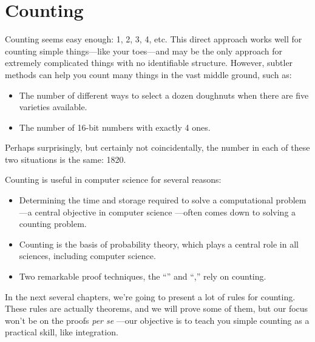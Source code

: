 \part{Counting}
\label{part:counting}

\partintro

Counting seems easy enough: 1, 2, 3, 4, etc.  This direct approach
works well for counting simple things---like your toes---and may be
the only approach for extremely complicated things with no
identifiable structure.  However, subtler methods can help you count
many things in the vast middle ground, such as:
\begin{itemize}

\item The number of different ways to select a dozen doughnuts when
there are five varieties available.

\item The number of 16-bit numbers with exactly 4 ones.

\end{itemize}
Perhaps surprisingly, but certainly not coincidentally, the number in
each of these two situations is the same: 1820.

Counting is useful in computer science for several reasons:
\begin{itemize}

\item

Determining the time and storage required to solve a computational
problem ---a central objective in computer science ---often comes down
to solving a counting problem.

\item

Counting is the basis of probability theory, which plays a central
role in all sciences, including computer science.

\item

Two remarkable proof techniques, the ``''
and ``,'' rely on counting.
\iffalse
These lead to a variety of interesting and useful insights.
\fi

\end{itemize}

In the next several chapters, we're going to present a lot of rules
for counting.  These rules are actually theorems, and we will prove
some of them, but our focus won't be on the proofs \emph{per se} ---our
objective is to teach you simple counting as a practical skill, like
integration.

